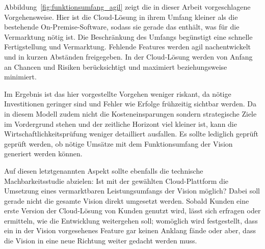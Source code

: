 
Abbildung~\ref{fig:funktionsumfang_agil} zeigt die in dieser Arbeit 
vorgeschlagene Vorgehensweise. Hier ist die Cloud-Lösung in ihrem Umfang kleiner 
als die bestehende On-Premise-Software, sodass sie gerade das 
enthält, was für die Vermarktung nötig ist. Die Beschränkung des Umfangs 
begünstigt eine schnelle Fertigstellung und Vermarktung. Fehlende Features 
werden agil nachentwickelt und in kurzen Abständen freigegeben. In der 
Cloud-Lösung werden von Anfang an Chancen und Risiken berücksichtigt und 
maximiert beziehungsweise minimiert. 

Im Ergebnis ist das hier vorgestellte Vorgehen weniger riskant, da nötige 
Investitionen geringer sind und Fehler wie Erfolge frühzeitig sichtbar werden. 
Da in diesem Modell zudem nicht die Kosteneinsparungen sondern strategische 
Ziele im Vordergrund stehen und der zeitliche Horizont viel kleiner ist, kann 
die Wirtschaftlichkeitsprüfung weniger detailliert ausfallen. Es sollte 
lediglich geprüft geprüft werden, ob nötige Umsätze mit dem Funktionsumfang der 
Vision generiert werden können. 

Auf diesen letztgenannten Aspekt sollte ebenfalls die technische 
Machbarkeitsstudie abzielen: Ist mit der gewählten Cloud-Plattform die 
Umsetzung eines vermarktbaren Leistungsumfangs der Vision möglich? Dabei soll 
gerade nicht die gesamte Vision direkt umgesetzt werden. Sobald Kunden eine 
erste Version der Cloud-Lösung von Kunden genutzt wird, lässt sich erfragen 
oder ermitteln, wie die Entwicklung weitergehen soll; womöglich wird 
festgestellt, dass ein in der Vision vorgesehenes Feature gar keinen Anklang 
fände oder aber, dass die Vision in eine neue Richtung weiter gedacht werden 
muss.


\begin{comment}
\subsubsection{Technische Machbarkeit}


\subsubsection{Wirtschaftliche Machbarkeit}
"`In diesem Punkt unterscheidet sich Cloud-Computing von früheren Paradigmen
wie Outsourcing, welches nicht auf das Geschäftsmodell des Unternehmens wirken
will. Durch neue Anwendungsszenarien kann mit Cloud-Computing ein beachtlicher
Mehrwert geschaffen werden."' \pcite{}{154}{cloud_migration}

"`Alle Empfehlungen sollten mit einem Business Case hinterlegt werden, der
die Höhe der Kostenreduktion und die Verbesserung des Servicelevels zeigt."'
\pcite{}{158}{cloud_migration}
\end{comment}


